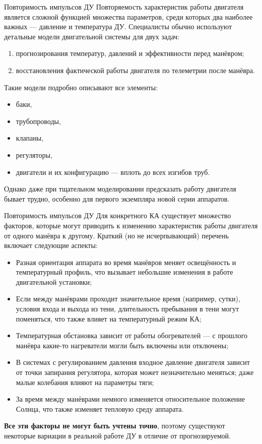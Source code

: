 \documentclass[8pt]{beamer}
\begin{document}
\begin{frame}{Повторимость импульсов ДУ}
Повторяемость характеристик работы двигателя является сложной функцией множества параметров, среди которых два наиболее важных — давление и температура ДУ. Специалисты обычно используют детальные модели двигательной системы для двух задач:
\begin{enumerate}
    \item прогнозирования температур, давлений и эффективности перед манёвром;
    \item восстановления фактической работы двигателя по телеметрии после манёвра.
\end{enumerate}
Такие модели подробно описывают все элементы: 
\begin{itemize}
    \item баки,
    \item трубопроводы,
    \item клапаны,
    \item регуляторы,
    \item двигатели и их конфигурацию — вплоть до всех изгибов труб.
\end{itemize}
Однако даже при тщательном моделировании предсказать работу двигателя бывает трудно, особенно для первого экземпляра новой серии аппаратов.
\end{frame}

\begin{frame}{Повторимость импульсов ДУ}
Для конкретного КА существует множество факторов, которые могут приводить к изменению характеристик работы двигателя от одного манёвра к другому. Краткий (но не исчерпывающий) перечень включает следующие аспекты:
\begin{itemize}
    \item Разная ориентация аппарата во время манёвров меняет освещённость и температурный профиль, что вызывает небольшие изменения в работе двигательной установки;
    \item Если между манёврами проходит значительное время (например, сутки), условия входа и выхода из тени, длительность пребывания в тени могут поменяться, что также влияет на температурный режим КА;
    \item Температурная обстановка зависит от работы обогревателей — с прошлого манёвра какие-то нагреватели могли быть включены или отключены;
    \item В системах с регулированием давления входное давление двигателя зависит от точки запирания регулятора, которая может незначительно меняться; даже малые колебания влияют на параметры тяги;
    \item За время между манёврами немного изменяется относительное положение Солнца, что также изменяет тепловую среду аппарата.
\end{itemize}
\textbf{Все эти факторы не могут быть учтены точно}, поэтому существуют некоторые вариации в реальной работе ДУ в отличие от прогнозируемой.
\end{frame}
\end{document}
